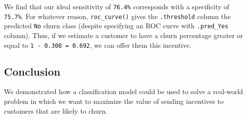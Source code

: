 \documentclass[
]{article}
\begin{document}
We find that our ideal sensitivity of \texttt{76.4\%} corresponds with a
specificity of \texttt{75.7\%}. For whatever reason,
\texttt{roc\_curve()} gives the \texttt{.threshold} column the predicted
\texttt{No} churn class (despite specifying an ROC curve with
\texttt{.pred\_Yes} column). Thus, if we estimate a customer to have a
churn percentage greater or equal to \texttt{1\ -\ 0.308\ =\ 0.692}, we
can offer them this incentive.

\hypertarget{conclusion}{%
\subsection{Conclusion}\label{conclusion}}

We demonstrated how a classification model could be used to solve a
real-world problem in which we want to maximize the value of sending
incentives to customers that are likely to churn.
\end{document}
